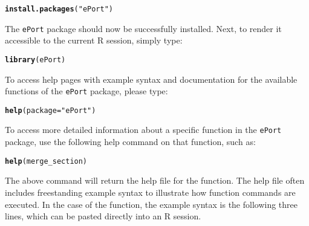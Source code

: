 \documentclass{article}\usepackage[]{graphicx}\usepackage[]{color}
\makeatletter
\newcommand{\hlstr}[1]{\textcolor[rgb]{0.192,0.494,0.8}{#1}}%
\newcommand{\hlstd}[1]{\textcolor[rgb]{0.345,0.345,0.345}{#1}}%
\newcommand{\hlkwc}[1]{\textcolor[rgb]{0.333,0.667,0.333}{#1}}%
\newcommand{\hlkwd}[1]{\textcolor[rgb]{0.737,0.353,0.396}{\textbf{#1}}}%
\newenvironment{kframe}{%
 \def\at@end@of@kframe{}%
 \ifinner\ifhmode%
  \def\at@end@of@kframe{\end{minipage}}%
  \begin{minipage}{\columnwidth}%
 \fi\fi%
 \def\FrameCommand##1{\hskip\@totalleftmargin \hskip-\fboxsep
 \colorbox{shadecolor}{##1}\hskip-\fboxsep
     \hskip-\linewidth \hskip-\@totalleftmargin \hskip\columnwidth}%
 \MakeFramed {\advance\hsize-\width
   \@totalleftmargin\z@ \linewidth\hsize
   \@setminipage}}%
 {\par\unskip\endMakeFramed%
 \at@end@of@kframe}
\newenvironment{knitrout}{}{} %
\numberwithin{equation}{section} %
\newcommand{\pkg}[1]{{\texttt{#1}}}
\newcommand{\R}{{\normalfont\textsf{R }}{}}
\makeatother
\begin{document}
\begin{knitrout}
\color{fgcolor}\begin{kframe}
\begin{alltt}
\hlkwd{install.packages}\hlstd{(}\hlstr{"ePort"}\hlstd{)}
\end{alltt}
\end{kframe}
\end{knitrout}

\noindent
The \pkg{ePort} package should now be successfully installed. Next, to render it accessible to the current \R session, simply type:

\begin{knitrout}
\color{fgcolor}\begin{kframe}
\begin{alltt}
\hlkwd{library}\hlstd{(ePort)}
\end{alltt}
\end{kframe}
\end{knitrout}

To access help pages with example syntax and documentation for the available functions of the \pkg{ePort} package, please type:

\begin{knitrout}
\color{fgcolor}\begin{kframe}
\begin{alltt}
\hlkwd{help}\hlstd{(}\hlkwc{package}\hlstd{=}\hlstr{"ePort"}\hlstd{)}
\end{alltt}
\end{kframe}
\end{knitrout}

To access more detailed information about a specific function in the \pkg{ePort} package, use the following help command on that function, such as:

\begin{knitrout}
\color{fgcolor}\begin{kframe}
\begin{alltt}
\hlkwd{help}\hlstd{(merge_section)}
\end{alltt}
\end{kframe}
\end{knitrout}

The above command will return the help file for the function. The help file often includes freestanding example syntax to illustrate how function commands are executed. In the case of the function, the example syntax is the following three lines, which can be pasted directly into an \R session.
\end{document}
